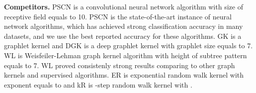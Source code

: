 \documentclass{article}
\theoremstyle{definition}
\begin{document}
\begin{table}[ht]
\caption{Graph datasets used in classification experiments. The columns are: Name of dataset, Number of graphs, Number of classes (maximum number of graphs in a class), Average number of nodes/edges.}
\label{dataset_properties}
\vskip 0.15in
\begin{small}
\end{small}
\vskip -0.1in
\end{table}

\textbf{Competitors.} PSCN is a convolutional neural network algorithm \cite{learncnn:16} with size of receptive field equals to 10. PSCN is the state-of-the-art instance of neural network algorithms, which has achieved strong classification accuracy in many datasets, and we use the best reported accuracy for these algorithms. GK is a graphlet kernel \cite{graphlet:09} and DGK is a deep graphlet kernel \cite{deepgraph} with graphlet size equals to 7. WL is Weisfeiler-Lehman graph kernel algorithm \cite{wlkernel:11} with height of subtree pattern equals to 7. WL proved consistenly strong results comparing to other graph kernels and supervised algorithms. ER is exponential random walk kernel \cite{gartner:hardness} with exponent equals to  and kR is -step random walk kernel with  \cite{halting:15}.  
\end{document}
